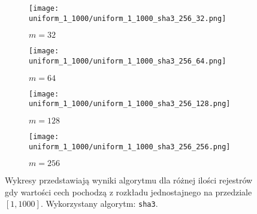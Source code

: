 \begin{figure}[H]
    \begin{subfigure}{0.5\textwidth}
        \texttt{[image: uniform\_1\_1000/uniform\_1\_1000\_sha3\_256\_32.png]}
        \caption{$m = 32$}
        \label{fig:subim1}
    \end{subfigure}
    \begin{subfigure}{0.5\textwidth}
        \texttt{[image: uniform\_1\_1000/uniform\_1\_1000\_sha3\_256\_64.png]}
        \caption{$m = 64$}
        \label{fig:subim1}
    \end{subfigure}
    \begin{subfigure}{0.5\textwidth}
        \texttt{[image: uniform\_1\_1000/uniform\_1\_1000\_sha3\_256\_128.png]}
        \caption{$m = 128$}
        \label{fig:subim2}
    \end{subfigure}
    \begin{subfigure}{0.5\textwidth}
        \texttt{[image: uniform\_1\_1000/uniform\_1\_1000\_sha3\_256\_256.png]}
        \caption{$m = 256$}
        \label{fig:subim2}
    \end{subfigure}

    \caption{Wykresy przedstawiają wyniki algorytmu dla różnej ilości rejestrów gdy wartości cech pochodzą z rozkładu jednostajnego na przedziale $[1, 1000]$. Wykorzystany algorytm: \texttt{sha3}.}
    \label{fig:uniform_sha3_256}
\end{figure}
